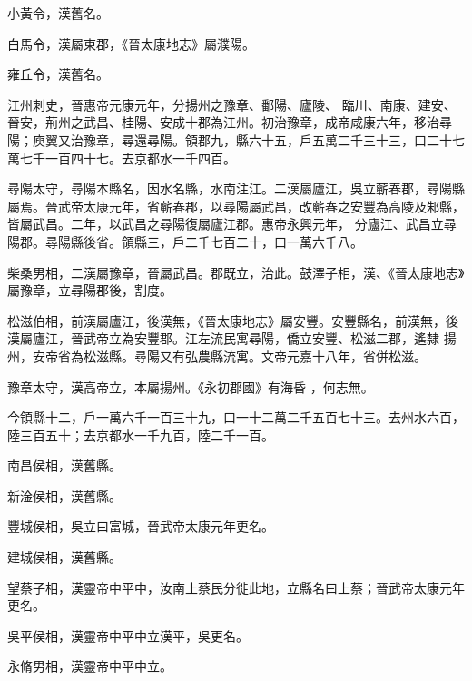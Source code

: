 \begin{pinyinscope}
 小黃令，漢舊名。



 白馬令，漢屬東郡，《晉太康地志》屬濮陽。



 雍丘令，漢舊名。



 江州刺史，晉惠帝元康元年，分揚州之豫章、鄱陽、廬陵、
 臨川、南康、建安、晉安，荊州之武昌、桂陽、安成十郡為江州。初治豫章，成帝咸康六年，移治尋陽；庾翼又治豫章，尋還尋陽。領郡九，縣六十五，戶五萬二千三十三，口二十七萬七千一百四十七。去京都水一千四百。



 尋陽太守，尋陽本縣名，因水名縣，水南注江。二漢屬廬江，吳立蘄春郡，尋陽縣屬焉。晉武帝太康元年，省蘄春郡，以尋陽屬武昌，改蘄春之安豐為高陵及邾縣，皆屬武昌。二年，以武昌之尋陽復屬廬江郡。惠帝永興元年，
 分廬江、武昌立尋陽郡。尋陽縣後省。領縣三，戶二千七百二十，口一萬六千八。



 柴桑男相，二漢屬豫章，晉屬武昌。郡既立，治此。鼓澤子相，漢、《晉太康地志》屬豫章，立尋陽郡後，割度。



 松滋伯相，前漢屬廬江，後漢無，《晉太康地志》屬安豐。安豐縣名，前漢無，後漢屬廬江，晉武帝立為安豐郡。江左流民寓尋陽，僑立安豐、松滋二郡，遙隸
 揚州，安帝省為松滋縣。尋陽又有弘農縣流寓。文帝元嘉十八年，省併松滋。


豫章太守，漢高帝立，本屬揚州。《永初郡國》有海昏
 ，何志無。



 今領縣十二，戶一萬六千一百三十九，口一十二萬二千五百七十三。去州水六百，陸三百五十；去京都水一千九百，陸二千一百。



 南昌侯相，漢舊縣。



 新淦侯相，漢舊縣。



 豐城侯相，吳立曰富城，晉武帝太康元年更名。



 建城侯相，漢舊縣。



 望蔡子相，漢靈帝中平中，汝南上蔡民分徙此地，立縣名曰上蔡；晉武帝太康元年更名。



 吳平侯相，漢靈帝中平中立漢平，吳更名。



 永脩男相，漢靈帝中平中立。




\end{pinyinscope}
